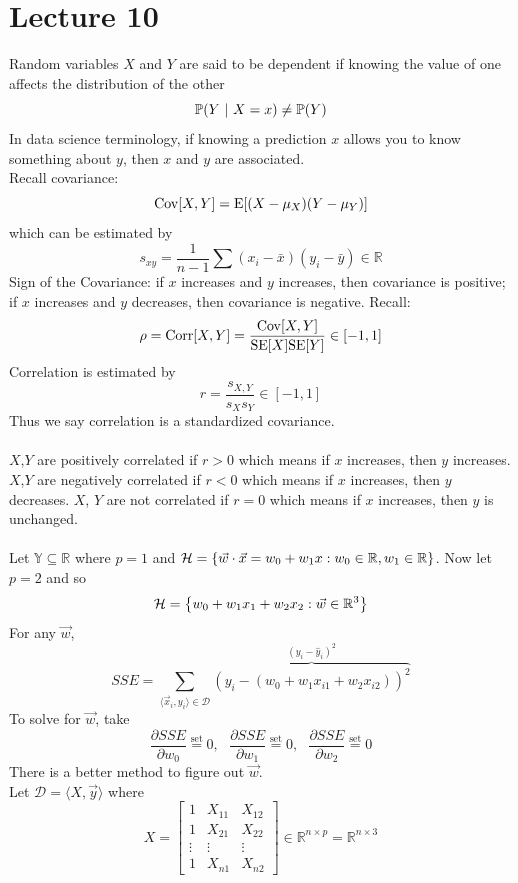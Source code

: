 \documentclass[12pt]{article}
\begin{document}
\section{Lecture 10} 
Random variables $X$ and $Y$ are said to be dependent if knowing the value of one affects the distribution of the other $$\mathbb{P}(Y~|~X=x) \neq \mathbb{P}(Y)$$ 
In data science terminology, if knowing a prediction $x$ allows you to know something about $y$, then $x$ and $y$ are associated. \\
Recall covariance: $$ \mathrm{Cov}[ X,Y ] = \mathrm{E}[ (X - \mu_X)(Y - \mu_Y) ]$$ which can be estimated by $$s_{xy} = \frac{1}{n-1}\sum (x_i - \bar{x})(y_i - \bar{y}) \in \mathbb{R}$$ 
Sign of the Covariance: if $x$ increases and $y$ increases, then covariance is positive; if $x$ increases and $y$ decreases, then covariance is negative. 
Recall: $$\rho = \mathrm{Corr}[ X,Y ] = \frac{\mathrm{Cov}[ X,Y ]}{\mathrm{SE}[ X ]\mathrm{SE}[ Y ]} \in [-1,1] $$ 
Correlation is estimated by $$r = \frac{s_{X,Y}}{s_Xs_Y} \in [-1,1] $$ 
Thus we say correlation is a standardized covariance. \\~\\
$X$,$Y$ are positively correlated if $r>0$ which means if $x$ increases, then $y$ increases. $X$,$Y$ are negatively correlated if $r<0$ which means if $x$ increases, then $y$ decreases. $X$, $Y$ are not correlated if $r=0$ which means if $x$ increases, then $y$ is unchanged. \\~\\
Let $\mathbb{Y} \subseteq \mathbb{R}$ where $p = 1$ and $\mathcal{H} = \left\{ \vec{w} \cdot \vec{x} = w_0 + w_1x: w_0 \in \mathbb{R}, w_1 \in \mathbb{R} \right\}$. Now let $p=2$ and so $$\mathcal{H} = \left\{ w_0 + w_1x_1 + w_2x_2: \vec{w} \in \mathbb{R}^3 \right\} $$ 
For any $\vec{w}$, $$ SSE = \sum_{\langle \vec{x}_i, y_i \rangle \in \mathcal{D}} \overbrace{(y_i - (w_0 + w_1x_{i1} + w_2x_{i2}))^2}^{(y_i - \hat{y}_i)^2}$$ 
To solve for $\vec{w}$, take $$ \frac{\partial SSE}{\partial w_0} \stackrel{\text{set}}{=} 0, ~~~ \frac{\partial SSE}{\partial w_1} \stackrel{\text{set}}{=} 0, ~~~ \frac{\partial SSE}{\partial w_2} \stackrel{\text{set}}{=} 0 $$ 
There is a better method to figure out $\vec{w}$. \\
Let $\mathcal{D} = \langle X, \vec{y} \rangle$ where $$ X = \begin{bmatrix} 1 & X_{11} & X_{12} \\ 1 & X_{21} & X_{22} \\ \vdots & \vdots & \vdots \\ 1 & X_{n1} & X_{n2} \end{bmatrix} \in \mathbb{R}^{n\times p} = \mathbb{R}^{n\times 3} $$
\end{document}
